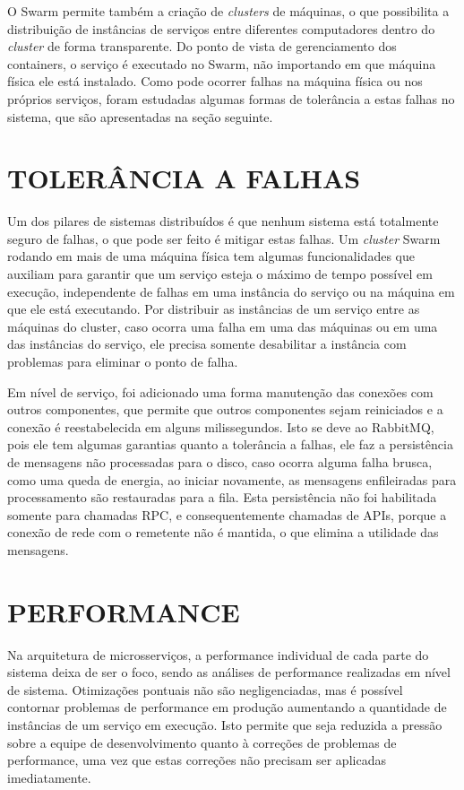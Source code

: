 O Swarm permite também a criação de \emph{clusters} de máquinas, o que
possibilita a distribuição de instâncias de serviços entre diferentes
computadores dentro do \emph{cluster} de forma transparente. Do ponto de
vista de gerenciamento dos containers, o serviço é executado no
Swarm, não importando em que máquina física ele está instalado. Como pode
ocorrer falhas na máquina física ou nos próprios serviços, foram estudadas
algumas formas de tolerância a estas falhas no sistema, que são apresentadas
na seção seguinte.

\section{TOLERÂNCIA A FALHAS}

Um dos pilares de sistemas distribuídos é que nenhum sistema está totalmente
seguro de falhas, o que pode ser feito é mitigar estas falhas. Um
\emph{cluster} Swarm rodando em mais de uma máquina física tem algumas
funcionalidades que auxiliam para garantir que um serviço esteja o máximo
de tempo possível em execução, independente de falhas em uma instância do
serviço ou na máquina em que ele está executando. Por distribuir as instâncias
de um serviço entre as máquinas do cluster, caso ocorra uma falha em uma das
máquinas ou em uma das instâncias do serviço, ele precisa somente desabilitar
a instância com problemas para eliminar o ponto de falha.

Em nível de serviço, foi adicionado uma forma manutenção das conexões com
outros componentes, que permite que outros componentes sejam reiniciados e
a conexão é reestabelecida em alguns milissegundos. Isto se deve ao RabbitMQ,
pois ele tem algumas garantias quanto a tolerância a falhas, ele faz a
persistência de mensagens não processadas para o disco, caso ocorra alguma
falha brusca, como uma queda de energia, ao iniciar novamente, as mensagens
enfileiradas para processamento são restauradas para a fila. Esta persistência
não foi habilitada somente para chamadas \ac{RPC}, e consequentemente
chamadas de \acp{API}, porque a conexão de rede com o remetente não é mantida,
o que elimina a utilidade das mensagens.

\section{PERFORMANCE}

Na arquitetura de microsserviços, a performance individual de cada parte
do sistema deixa de ser o foco, sendo as análises de performance realizadas
em nível de sistema. Otimizações pontuais não são negligenciadas, mas é
possível contornar problemas de performance em produção aumentando a
quantidade de instâncias de um serviço em execução. Isto permite que
seja reduzida a pressão sobre a equipe de desenvolvimento quanto à correções
de problemas de performance, uma vez que estas correções não precisam ser
aplicadas imediatamente.

